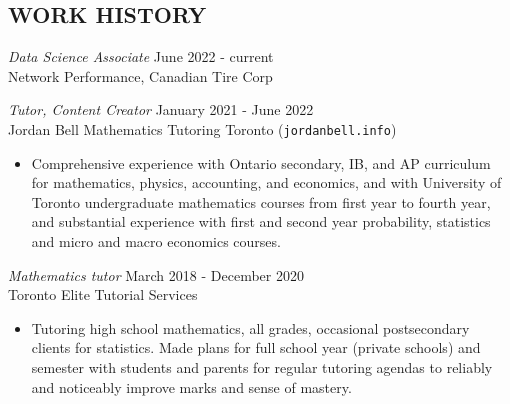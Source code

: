 \documentclass[margin, 10pt]{res} %
\begin{document}
\begin{resume}

 



 
\section{WORK HISTORY}

{\sl Data Science Associate} \hfill June 2022 - current \\
Network Performance, Canadian Tire Corp

{\sl Tutor, Content Creator} \hfill January 2021 - June 2022 \\
Jordan Bell Mathematics Tutoring Toronto (\texttt{jordanbell.info})

\begin{itemize} \itemsep -2pt %
\item Comprehensive experience with Ontario secondary, IB, and AP curriculum for mathematics, physics, accounting, and economics, and with University of Toronto undergraduate mathematics courses from first year to fourth year, and substantial experience with first and second year probability, statistics and micro and macro economics courses.
\end{itemize}

{\sl Mathematics tutor} \hfill March 2018 - December 2020 \\
Toronto Elite Tutorial Services

\begin{itemize} \itemsep -2pt %
\item Tutoring high school mathematics, all grades, occasional postsecondary clients for statistics. Made plans for full school year (private schools) and semester with students and parents for regular tutoring agendas to reliably and noticeably improve marks and sense of mastery. 
\end{itemize}


\end{resume}
\end{document}
